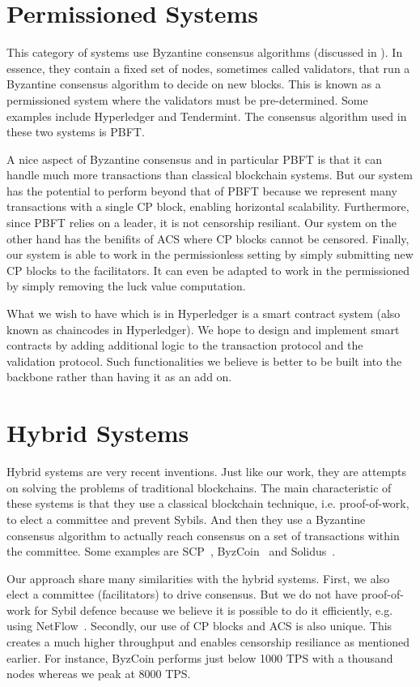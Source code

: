 \section{Permissioned Systems}

This category of systems use Byzantine consensus algorithms (discussed in ).
In essence, they contain a fixed set of nodes, sometimes called validators,
that run a Byzantine consensus algorithm to decide on new blocks.
This is known as a permissioned system where the validators must be pre-determined.
Some examples include Hyperledger and Tendermint.
The consensus algorithm used in these two systems is PBFT.

A nice aspect of Byzantine consensus and in particular PBFT is that it can handle much more transactions than classical blockchain systems.
But our system has the potential to perform beyond that of PBFT because we represent many transactions with a single CP block,
enabling horizontal scalability.
Furthermore, since PBFT relies on a leader, it is not censorship resiliant.
Our system on the other hand has the benifits of ACS where CP blocks cannot be censored.
Finally, our system is able to work in the permissionless setting by simply submitting new CP blocks to the facilitators.
It can even be adapted to work in the permissioned by simply removing the luck value computation.

What we wish to have which is in Hyperledger is a smart contract system (also known as chaincodes in Hyperledger).
We hope to design and implement smart contracts by adding additional logic to the transaction protocol and the validation protocol.
Such functionalities we believe is better to be built into the backbone rather than having it as an add on.


\section{Hybrid Systems}
Hybrid systems are very recent inventions.
Just like our work, they are attempts on solving the problems of traditional blockchains.
The main characteristic of these systems is that they use a classical blockchain technique,
i.e. proof-of-work, to elect a committee and prevent Sybils.
And then they use a Byzantine consensus algorithm to actually reach consensus on a set of transactions within the committee.
Some examples are SCP~\cite{luu2015scp}, ByzCoin~\cite{kogias2016enhancing} and Solidus~\cite{abraham2016solidus}.

Our approach share many similarities with the hybrid systems.
First, we also elect a committee (facilitators) to drive consensus.
But we do not have proof-of-work for Sybil defence because we believe 
it is possible to do it efficiently, e.g. using NetFlow~\cite{pimotte}.
Secondly, our use of CP blocks and ACS is also unique.
This creates a much higher throughput and enables censorship resiliance as mentioned earlier.
For instance, ByzCoin performs just below 1000 TPS with a thousand nodes whereas we peak at 8000 TPS.

